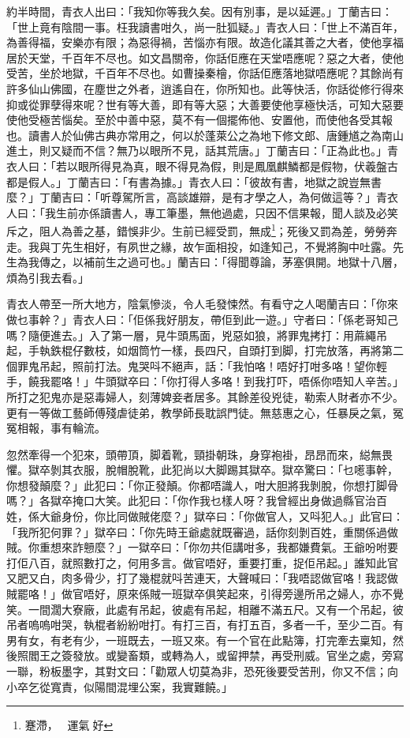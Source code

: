 \documentclass[a5paper, 12pt, openany]{book} %
\begin{document}
	約半時間，青衣人出曰：「我知你等我久矣。因有別事，是以延遲。」丁蘭吉曰：「世上竟有陰間一事。枉我讀書咁久，尚一肚狐疑。」青衣人曰：「世上不滿百年，為善得福，安樂亦有限；為惡得禍，苦惱亦有限。故造化議其善之大者，使他享福居於天堂，千百年不尽也。如文昌關帝，你話佢應在天堂唔應呢？惡之大者，使他受苦，坐於地獄，千百年不尽也。如曹操秦檜，你話佢應落地獄唔應呢？其餘尚有許多仙山佛國，在塵世之外者，逍遙自在，你所知也。此等快活，你話從修行得來抑或從罪孽得來呢？世有等大善，即有等大惡；大善要使他享極快活，可知大惡要使他受極苦惱矣。至於中善中惡，莫不有一個擺佈他、安置他，而使他各受其報也。讀書人於仙佛古典亦常用之，何以於蓬萊公之為地下修文郎、唐鍾馗之為南山進土，則又疑而不信？無乃以眼所不見，話其荒唐。」丁蘭吉曰：「正為此也。」青衣人曰：「若以眼所得見為真，眼不得見為假，則是鳳凰麒鱗都是假物，伏羲盤古都是假人。」丁蘭吉曰：「有書為據。」青衣人曰：「彼故有書，地獄之說豈無書麼？」丁蘭吉曰：「听尊駕所言，高談雄辯，是有才學之人，為何做這等？」青衣人曰：「我生前亦係讀書人，專工筆墨，無他過處，只因不信果報，聞人談及必笑斥之，阻人為善之基，錯悞非少。生前已經受罰，無成\footnote{蹇滯，󱞹󱀝，運氣𠄡好}；死後又罰為差，勞勞奔走。我與丁先生相好，有夙世之緣，故乍面相投，如逢知己，不覺將胸中吐露。先生為我傳之，以補前生之過可也。」蘭吉曰：「得聞尊論，茅塞俱開。地獄十八層，煩為引我去看。」

	青衣人帶至一所大地方，陰氣慘淡，令人毛發悚然。有看守之人喝蘭吉曰：「你來做乜事幹？」青衣人曰：「佢係我好朋友，帶佢到此一遊。」守者曰：「係老哥知己嗎？隨便進去。」入了第一層，見牛頭馬面，兇惡如狼，將罪鬼拷打：用蔴繩吊起，手執鉄棍仔數枝，如烟筒竹一樣，長四尺，自頭打到脚，打完放落，再將第二個罪鬼吊起，照前打法。鬼哭呌不絕声，話：「我怕咯！唔好打咁多咯！望你輕手，饒我罷咯！」牛頭獄卒曰：「你打得人多咯！到我打吓，唔係你唔知人辛苦。」所打之犯鬼亦是惡毒婦人，刻薄婢妾者居多。其餘差役兇徒，勒索人財者亦不少。更有一等做工藝師傅殘虐徒弟，教學師長耽誤門徒。無慈惠之心，任暴戾之氣，冤冤相報，事有輪流。

	忽然牽得一个犯來，頭帶頂，脚着靴，頸掛朝珠，身穿袍褂，昂昂而來，縂無畏懼。獄卒剝其衣服，脫帽脫靴，此犯尚以大脚踢其獄卒。獄卒驚曰：「乜㘃事幹，你想發顛麼？」此犯曰：「你正發顛。你都唔識人，咁大胆將我剝脫，你想打脚骨嗎？」各獄卒掩口大笑。此犯曰：「你作我乜樣人呀？我曾經出身做過縣官治百姓，係大爺身份，你比同做賊佬麼？」獄卒曰：「你做官人，又呌犯人。」此官曰：「我所犯何罪？」獄卒曰：「你先時王爺處就既審過，話你刻剝百姓，重關係過做賊。你重想來詐戅麼？」一獄卒曰：「你勿共佢講咁多，我都嫌費氣。王爺吩咐要打佢八百，就照數打之，何用多言。做官唔好，重要打重，捉佢吊起。」誰知此官又肥又白，肉多骨少，打了幾棍就呌苦連天，大聲喊曰：「我唔認做官咯！我認做賊罷咯！」做官唔好，原來係賊一班獄卒俱笑起來，引得旁邊所吊之婦人，亦不覺笑。一間濶大寮廠，此處有吊起，彼處有吊起，相離不滿五尺。又有一个吊起，彼吊者嗚嗚咁哭，執棍者紛紛咁打。有打三百，有打五百，多者一千，至少二百。有男有女，有老有少，一班既去，一班又來。有一个官在此點簿，打完牽去稟知，然後照閻王之簽發放。或變畜類，或轉為人，或留押禁，再受刑威。官坐之處，旁寫一聯，粉板墨字，其對文曰：「勸眾人切莫為非，恐死後要受苦刑，你又不信；向小卒乞從寬責，似陽間混埋公案，我實難饒。」
\end{document}
